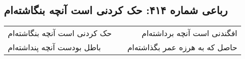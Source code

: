\begin{center}
\section*{رباعی شماره ۴۱۴: حک کردنی است آنچه بنگاشته‌ام}
\label{sec:sh414}
\begin{longtable}{l p{0.5cm} r}
حک کردنی است آنچه بنگاشته‌ام
&&
افگندنی است آنچه برداشته‌ام
\\
باطل بودست آنچه پنداشته‌ام
&&
حاصل که به هرزه عمر بگذاشته‌ام
\\
\end{longtable}
\end{center}
